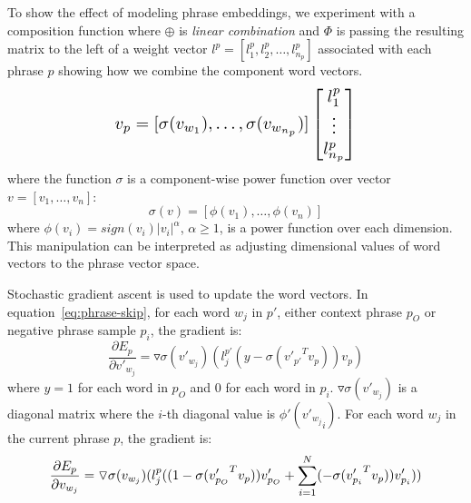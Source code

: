 To show the effect of modeling phrase embeddings, we experiment with a composition function where $\oplus$ is \textit{linear combination} and $\Phi$ is passing the resulting matrix to the left of a weight vector $l^p = [l_1^p , l_2^p, \ldots, l_{n_p}^p]$
associated with each phrase $p$ showing how we combine the component word vectors. 
\begin{equation}
\label{eq:linear}
\resizebox{.55\hsize}{!}{$\displaystyle
v_p = [\sigma(v_{w_1}), \ldots, \sigma(v_{w_{n_p}})] \begin{bmatrix} l_1^p \\ \vdots\\ l_{n_p}^p \end{bmatrix}
$}
\end{equation}
where the function $\sigma$ is a component-wise power function over vector $v=[v_1, \ldots, v_n]$:
\begin{equation}
    \sigma(v) = [\phi(v_1), \ldots, \phi(v_n)]
\end{equation}
where $\phi(v_i)=\textit{sign}(v_i)|v_i|^{\alpha}$, $\alpha\geq 1$, is a power function over each dimension. This manipulation can be interpreted as adjusting dimensional values of word vectors to the phrase vector space.


Stochastic gradient ascent is used to update the word vectors. In equation~\ref{eq:phrase-skip}, for each word $w_j$ in $p'$, either context phrase $p_O$ or negative 
phrase sample $p_i$, the gradient is:
\begin{equation}
    \frac{\partial E_p}{\partial v'_{w_j}} = \triangledown \sigma(v'_{w_j}) (l_j^{p'} (y-\sigma({v'_{p'}}^T v_p)) v_p) 
\end{equation}
where $y=1$ for each word in $p_O$ and 0 for each word in $p_i$. $\triangledown \sigma(v'_{w_j})$ is a diagonal matrix where the $i$-th diagonal value is $\phi'({v'_{w_j}}_i)$.
For each word $w_j$ in the current phrase $p$, the gradient is:
\begin{equation}
\resizebox{.85\hsize}{!}{$\displaystyle
\frac{\partial E_p}{\partial v_{w_j}} = \triangledown \sigma(v_{w_j}) (l_j^{p} ((1-\sigma({v'_{p_O}}^T v_p)) v'_{p_O} + \sum_{i=1}^{N} (-\sigma({v'_{p_i}}^T v_p)) v'_{p_i})) 
$}
\end{equation}

